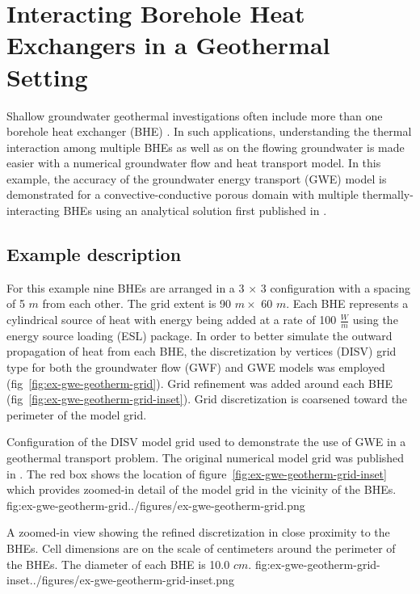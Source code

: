 \section{Interacting Borehole Heat Exchangers in a Geothermal Setting}

Shallow groundwater geothermal investigations often include more than one borehole heat exchanger (BHE) \citep{alKhoury2021}. In such applications, understanding the thermal interaction among multiple BHEs as well as on the flowing groundwater is made easier with a numerical groundwater flow and heat transport model.  In this example, the accuracy of the groundwater energy transport (GWE) model is demonstrated for a convective-conductive porous domain with multiple thermally-interacting BHEs using an analytical solution first published in \cite{alKhoury2021}.  

\subsection{Example description}

For this example nine BHEs are arranged in a 3 $\times$ 3 configuration with a spacing of 5 $m$ from each other. The grid extent is 90 $m \times$ 60 $m$.  Each BHE represents a cylindrical source of heat with energy being added at a rate of 100 $\tfrac{W}{m}$ using the energy source loading (ESL) package. In order to better simulate the outward propagation of heat from each BHE, the discretization by vertices (DISV) grid type for both the groundwater flow (GWF) and GWE models was employed (fig~\ref{fig:ex-gwe-geotherm-grid}). Grid refinement was added around each BHE (fig~\ref{fig:ex-gwe-geotherm-grid-inset}). Grid discretization is coarsened toward the perimeter of the model grid. 

\begin{StandardFigure}{
    Configuration of the DISV model grid used to demonstrate the use of GWE in a geothermal transport problem.  The original numerical model grid was published in \cite{alKhoury2021}.  The red box shows the location of figure~\ref{fig:ex-gwe-geotherm-grid-inset} which provides zoomed-in detail of the model grid in the vicinity of the BHEs.}
    {fig:ex-gwe-geotherm-grid}{../figures/ex-gwe-geotherm-grid.png}
\end{StandardFigure}            

\begin{StandardFigure}{
    A zoomed-in view showing the refined discretization in close proximity to the BHEs.  Cell dimensions are on the scale of centimeters around the perimeter of the BHEs.  The diameter of each BHE is 10.0 $cm$.}
    {fig:ex-gwe-geotherm-grid-inset}{../figures/ex-gwe-geotherm-grid-inset.png}
\end{StandardFigure}            

